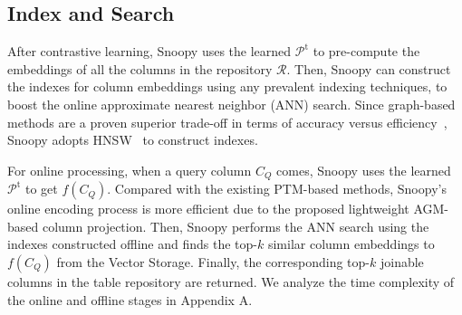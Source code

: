 \subsection{Index and Search}
\label{subsec:OnlineSearch}
After contrastive learning, \textsf{Snoopy} uses the learned $\mathcal{P}^\text{t}$ to pre-compute the embeddings of all the columns in the repository $\mathcal{R}$.
Then, \textsf{Snoopy} can construct the indexes for column embeddings using any prevalent indexing techniques, to boost the online approximate nearest neighbor (ANN) search. Since graph-based methods are a proven superior trade-off in terms of accuracy versus efficiency~\cite{WangXY021}, \textsf{Snoopy} adopts HNSW~\cite{HNSW} to construct indexes.

For online processing, when a query column $C_Q$ comes, \textsf{Snoopy} uses the learned $\mathcal{P}^\text{t}$ to get $f(C_Q)$. Compared with the existing PTM-based methods, \textsf{Snoopy}'s online encoding process is more efficient due to the proposed lightweight AGM-based column projection. Then, \textsf{Snoopy}  performs the ANN search using the indexes constructed offline and finds the top-$k$ similar column embeddings to $f(C_Q)$ from the Vector Storage. Finally, the corresponding top-$k$ joinable columns in the table repository are returned. We analyze the time complexity of  the online and offline stages in Appendix A.



